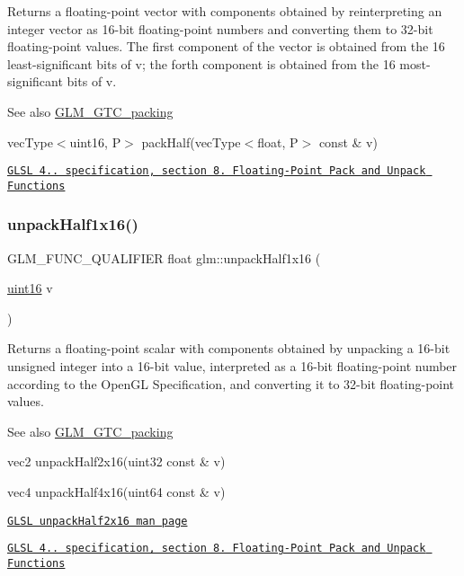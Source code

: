 Returns a floating-\/point vector with components obtained by reinterpreting an integer vector as 16-\/bit floating-\/point numbers and converting them to 32-\/bit floating-\/point values. The first component of the vector is obtained from the 16 least-\/significant bits of v; the forth component is obtained from the 16 most-\/significant bits of v.

\begin{DoxySeeAlso}{See also}
\hyperlink{group__gtc__packing}{G\+L\+M\+\_\+\+G\+T\+C\+\_\+packing} 

vec\+Type$<$uint16, P$>$ pack\+Half(vec\+Type$<$float, P$>$ const \& v) 

\href{http://www.opengl.org/registry/doc/GLSLangSpec.4.20.8.pdf}{\tt G\+L\+SL 4.. specification, section 8. Floating-\/\+Point Pack and Unpack Functions} 
\end{DoxySeeAlso}
\mbox{\label{group__gtc__packing_gaa6eebcdfc746584b7d1823f1d5344fed}} 
\subsubsection{\texorpdfstring{unpack\+Half1x16()}{unpackHalf1x16()}}
{\footnotesize\ttfamily G\+L\+M\+\_\+\+F\+U\+N\+C\+\_\+\+Q\+U\+A\+L\+I\+F\+I\+ER float glm\+::unpack\+Half1x16 (\begin{DoxyParamCaption}\item[{\hyperlink{group__gtc__type__precision_gad8c2939e1fdd8e5828b31d95c52255d5}{uint16}}]{v }\end{DoxyParamCaption})}

Returns a floating-\/point scalar with components obtained by unpacking a 16-\/bit unsigned integer into a 16-\/bit value, interpreted as a 16-\/bit floating-\/point number according to the Open\+GL Specification, and converting it to 32-\/bit floating-\/point values.

\begin{DoxySeeAlso}{See also}
\hyperlink{group__gtc__packing}{G\+L\+M\+\_\+\+G\+T\+C\+\_\+packing} 

vec2 unpack\+Half2x16(uint32 const \& v) 

vec4 unpack\+Half4x16(uint64 const \& v) 

\href{http://www.opengl.org/sdk/docs/manglsl/xhtml/unpackHalf2x16.xml}{\tt G\+L\+SL unpack\+Half2x16 man page} 

\href{http://www.opengl.org/registry/doc/GLSLangSpec.4.20.8.pdf}{\tt G\+L\+SL 4.. specification, section 8. Floating-\/\+Point Pack and Unpack Functions} 
\end{DoxySeeAlso}
\mbox{\label{group__gtc__packing_gaea526d6491ad40401eac34803984bf27}} 
